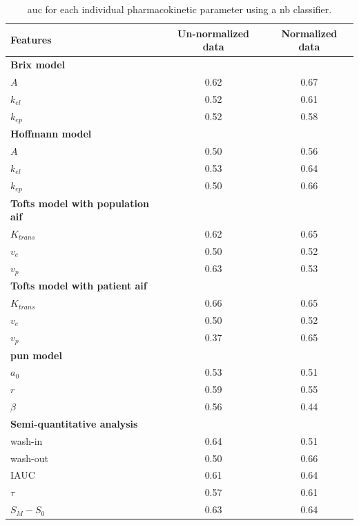 \begin{table}
  \caption{\acs*{auc} for each individual pharmacokinetic parameter using a \acs*{nb} classifier.}
  \centering
  \begin{tabular}{l c c}
    \toprule
    \textbf{Features} & Un-normalized data & Normalized data \\
    \midrule
    \textbf{Brix model} & & \\
    \quad $A$         & 0.62 & 0.67 \\
    \quad $k_{el}$    & 0.52 & 0.61 \\
    \quad $k_{ep}$    & 0.52 & 0.58 \\
    \textbf{Hoffmann model} & & \\
    \quad $A$         & 0.50 & 0.56 \\
    \quad $k_{el}$    & 0.53 & 0.64 \\
    \quad $k_{ep}$    & 0.50 & 0.66 \\
    \textbf{Tofts model with population \ac{aif}} & & \\
    \quad $K_{trans}$ & 0.62 & 0.65 \\
    \quad $v_{e}$     & 0.50 & 0.52 \\
    \quad $v_{p}$     & 0.63 & 0.53 \\
    \textbf{Tofts model with patient \ac{aif}} & & \\
    \quad $K_{trans}$ & 0.66 & 0.65 \\
    \quad $v_{e}$     & 0.50 & 0.52 \\
    \quad $v_{p}$     & 0.37 & 0.65 \\
    \textbf{\ac{pun} model} & & \\
    \quad $a_0$       & 0.53 & 0.51  \\
    \quad $r$         & 0.59 & 0.55 \\
    \quad $\beta$     & 0.56 & 0.44 \\
    \textbf{Semi-quantitative analysis} & & \\
    \quad wash-in     & 0.64 & 0.51 \\
    \quad wash-out    & 0.50 & 0.66 \\
    \quad IAUC        & 0.61 & 0.64 \\
    \quad $\tau$      & 0.57 & 0.61 \\
    \quad $S_M - S_0$ & 0.63 & 0.64 \\
    \bottomrule
  \end{tabular}
  \label{tab:resfeats}
\end{table}

